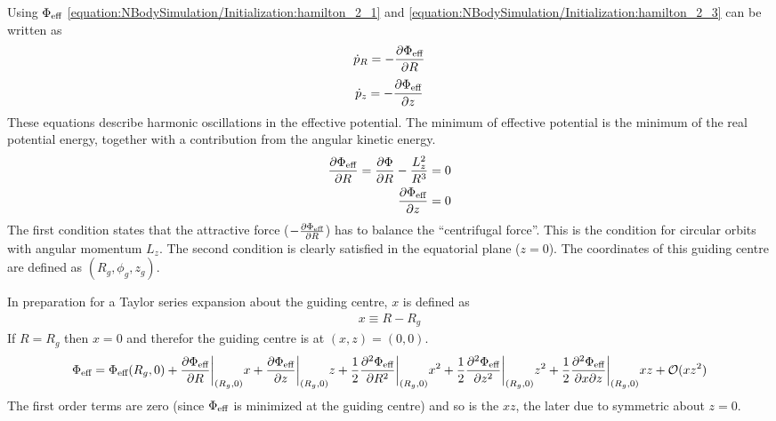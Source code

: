 \documentclass[letterpaper,10pt,english]{sphinxmanual}
\begin{document}
\sphinxAtStartPar
Using \(\Phi_{\textup{eff}}\) \eqref{equation:NBodySimulation/Initialization:hamilton_2_1} and \eqref{equation:NBodySimulation/Initialization:hamilton_2_3} can be written as
\begin{equation}\label{equation:NBodySimulation/Initialization:hamilton_eff_1}
\begin{split}\dot{p}_{R} = -\frac{\partial \Phi_{\textup{eff}} }{\partial R}\end{split}
\end{equation}\begin{equation}\label{equation:NBodySimulation/Initialization:hamilton_eff_2}
\begin{split}\dot{p}_{z} = -\frac{\partial \Phi_{\textup{eff}} }{\partial z}\end{split}
\end{equation}
\sphinxAtStartPar
These equations describe harmonic oscillations in the effective potential.
The minimum of effective potential is the minimum of the real potential energy, together with a contribution from the angular kinetic energy.
\begin{equation*}
\begin{split}\frac{\partial \Phi_{\textup{eff}} }{\partial R} = \frac{\partial \Phi }{\partial R} - \frac{L_z^2}{R^3} =0 \\
\frac{\partial \Phi_{\textup{eff}} }{\partial z} = 0\end{split}
\end{equation*}
\sphinxAtStartPar
The first condition states that the attractive force (\(-\frac{\partial \Phi_{\textup{eff}} }{\partial R}\)) has to balance the “centrifugal force”.
This is the condition for circular orbits with angular momentum \(L_z\).
The second condition is clearly satisfied in the equatorial plane (\(z=0\)).
The coordinates of this guiding centre are defined as \((R_g,\phi_g,z_g)\).

\sphinxAtStartPar
In preparation for a Taylor series expansion about the guiding centre, \(x\) is defined as
\begin{equation*}
\begin{split}x \equiv R - R_g\end{split}
\end{equation*}
\sphinxAtStartPar
If \(R = R_g\) then \(x=0\) and therefor the guiding centre is at \((x,z) = (0,0)\).
\begin{equation*}
\begin{split}\Phi_{\textup{eff}} = \Phi_{\textup{eff}}(R_g,0) +
\frac{\partial \Phi_{\textup{eff}} }{\partial R}\bigg|_{(R_g,0)}x +
\frac{\partial \Phi_{\textup{eff}} }{\partial z}\bigg|_{(R_g,0)}z +
\frac{1}{2}\frac{\partial^2 \Phi_{\textup{eff}} }{\partial R^2}\bigg|_{(R_g,0)}x^2 +
\frac{1}{2}\frac{\partial^2 \Phi_{\textup{eff}} }{\partial z^2}\bigg|_{(R_g,0)}z^2 +
\frac{1}{2}\frac{\partial^2 \Phi_{\textup{eff}} }{\partial x\partial z}\bigg|_{(R_g,0)}xz +
\mathcal{O}(xz^2)\end{split}
\end{equation*}
\sphinxAtStartPar
The first order terms are zero (since \(\Phi_{\textup{eff}}\) is minimized at the guiding centre) and so is the \(xz\), the later due to symmetric about \(z=0\).
\end{document}
